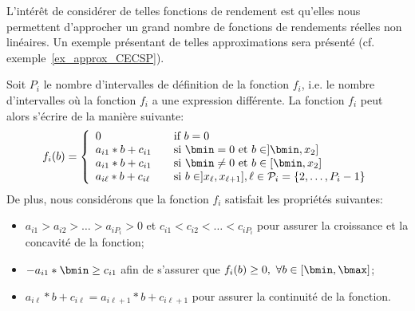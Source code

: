 L'intérêt de considérer de telles fonctions de rendement est qu'elles
nous permettent d'approcher un grand nombre de fonctions de
rendements réelles non linéaires. Un exemple présentant de telles
approximations sera présenté (cf. exemple~\ref{ex_approx_CECSP}). 


Soit $P_i$ le nombre d'intervalles de définition de la fonction
$f_i$, i.e. le nombre d'intervalles où la fonction $f_i$ a une
expression différente. La fonction $f_i$ peut alors s'écrire de la
manière suivante:  
\[f_i(b)=\left\{
    \begin{array}{ll}
      0 & \quad \text{if }b=0\\
      a_{i1}*b+c_{i1} &\quad \text{si }\bmin=0\text{ et }b \in ]\bmin,x_{2}] \\
      a_{i1}*b+c_{i1} &\quad \text{si }\bmin\neq 0 \text{ et }b \in
                            [\bmin,x_{2}] \\
      a_{i\ell}*b+c_{i\ell} &\quad \text{si } b \in
                                  ]x_{\ell},x_{\ell+1}], \ell \in \P_i=\{2,\dots,P_i-1\} 
    \end{array}
  \right.\]
De plus, nous considérons que la fonction $f_i$ satisfait les
propriétés suivantes: 
\begin{itemize}
\item $a_{i1} >a_{i2} > \dots > a_{iP_i}>0$ et $c_{i1}
  <c_{i2} < \dots < c_{iP_i}$ pour assurer la croissance et la
  concavité de la fonction; 
\item $-a_{i1}*\bmin \ge c_{i1}$  afin de s'assurer que $f_i(b) \ge
  0,\ \forall b \in [\bmin,\bmax]$;
\item $a_{i\ell}*b+c_{i\ell}=a_{i\ell+1}*b+c_{i\ell+1}$
  pour assurer la continuité de la fonction.
\end{itemize}

